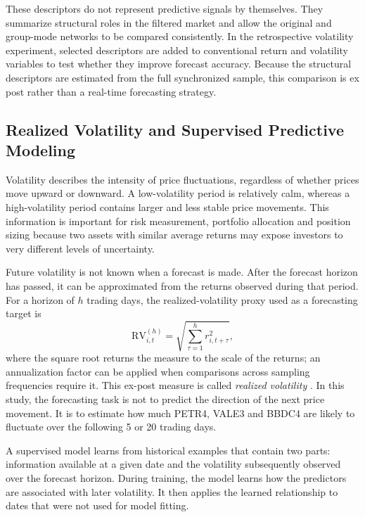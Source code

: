 These descriptors do not represent predictive signals by themselves. They summarize structural roles in the filtered market and allow the original and group-mode networks to be compared consistently. In the retrospective volatility experiment, selected descriptors are added to conventional return and volatility variables to test whether they improve forecast accuracy. Because the structural descriptors are estimated from the full synchronized sample, this comparison is ex post rather than a real-time forecasting strategy.

\subsection{Realized Volatility and Supervised Predictive Modeling}
\label{subsec:theory_volatility}

Volatility describes the intensity of price fluctuations, regardless of whether prices move upward or downward. A low-volatility period is relatively calm, whereas a high-volatility period contains larger and less stable price movements. This information is important for risk measurement, portfolio allocation and position sizing because two assets with similar average returns may expose investors to very different levels of uncertainty.

Future volatility is not known when a forecast is made. After the forecast horizon has passed, it can be approximated from the returns observed during that period. For a horizon of $h$ trading days, the realized-volatility proxy used as a forecasting target is
\begin{equation}
\mathrm{RV}_{i,t}^{(h)} = \sqrt{\sum_{\tau=1}^{h} r_{i,t+\tau}^{2}},
\label{eq:theory_rv}
\end{equation}
where the square root returns the measure to the scale of the returns; an annualization factor can be applied when comparisons across sampling frequencies require it. This ex-post measure is called \emph{realized volatility} \cite{andersen_2003_modeling}. In this study, the forecasting task is not to predict the direction of the next price movement. It is to estimate how much PETR4, VALE3 and BBDC4 are likely to fluctuate over the following 5 or 20 trading days.

A supervised model learns from historical examples that contain two parts: information available at a given date and the volatility subsequently observed over the forecast horizon. During training, the model learns how the predictors are associated with later volatility. It then applies the learned relationship to dates that were not used for model fitting.

